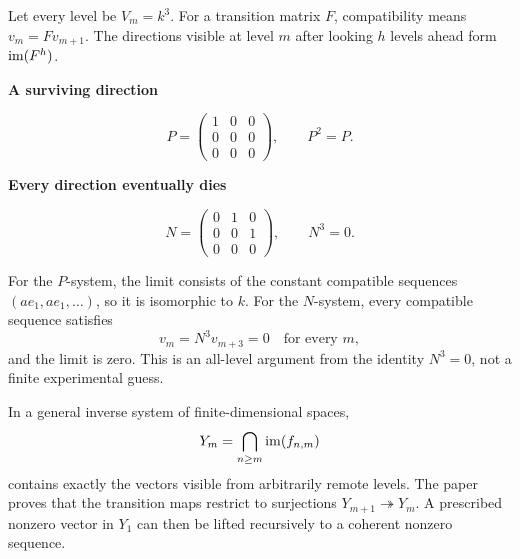 
Let every level be $V_m=k^3$. For a transition matrix $F$, compatibility means $v_m=Fv_{m+1}$. The directions visible at level $m$ after looking $h$ levels ahead form $\operatorname{im}(F^h)$.

\begin{minipage}[t]{.48\linewidth}\centering
{\sffamily\bfseries A surviving direction}\par
\[
P=\begin{pmatrix}1&0&0\\0&0&0\\0&0&0\end{pmatrix},\qquad P^2=P.
\]
\end{minipage}\hfill
\begin{minipage}[t]{.48\linewidth}\centering
{\sffamily\bfseries Every direction eventually dies}\par
\[
N=\begin{pmatrix}0&1&0\\0&0&1\\0&0&0\end{pmatrix},\qquad N^3=0.
\]
\end{minipage}

For the $P$-system, the limit consists of the constant compatible sequences $(a e_1,a e_1,\ldots)$, so it is isomorphic to $k$. For the $N$-system, every compatible sequence satisfies
\[
v_m=N^3v_{m+3}=0\quad\text{for every }m,
\]
and the limit is zero. This is an all-level argument from the identity $N^3=0$, not a finite experimental guess.

In a general inverse system of finite-dimensional spaces,
\[
Y_m=\bigcap_{n\ge m}\operatorname{im}(f_{n,m})
\]
contains exactly the vectors visible from arbitrarily remote levels. The paper proves that the transition maps restrict to surjections $Y_{m+1}\twoheadrightarrow Y_m$. A prescribed nonzero vector in $Y_1$ can then be lifted recursively to a coherent nonzero sequence.

